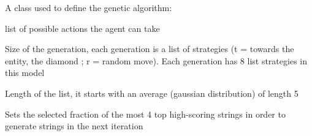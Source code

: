 \documentclass[letterpaper,10pt,english]{sphinxmanual}
\begin{document}
\begin{fulllineitems}
\label{\detokenize{index:algorithms.genetic.genetic}}
A class used to define the genetic algorithm:

\begin{fulllineitems}
\label{\detokenize{index:algorithms.genetic.genetic.set_actions}}
list of possible actions the agent can take

\end{fulllineitems}


\begin{fulllineitems}
\label{\detokenize{index:algorithms.genetic.genetic.set_gen_size}}
Size of the generation, each generation is a list of strategies (t = towards the entity, the diamond ; r = random move).
Each generation has 8 list strategies in this model

\end{fulllineitems}


\begin{fulllineitems}
\label{\detokenize{index:algorithms.genetic.genetic.set_str_len}}
Length of the list, it starts with an average (gaussian distribution) of length 5

\end{fulllineitems}


\begin{fulllineitems}
\label{\detokenize{index:algorithms.genetic.genetic.set_sel_frac}}
Sets the selected fraction of the most 4 top high-scoring strings in order to generate strings in the next iteration


\end{fulllineitems}
\end{fulllineitems}
\end{document}
